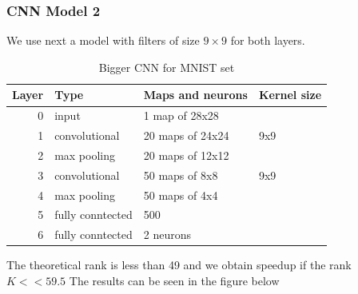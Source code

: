 \documentclass{article} %
\begin{document}
\subsubsection{CNN Model 2}

We use next a model with filters of size $9\times9$ for both layers.

\begin{table}
\centering
\begin{tabular}{@{}rlll@{}}\toprule
Layer & Type & Maps and neurons& Kernel size \\ \midrule
0 & input & 1 map of 28x28 &\\
1& convolutional & 20 maps of 24x24 & 9x9\\
2 & max pooling & 20 maps of 12x12 &  \\
3 & convolutional & 50 maps of 8x8& 9x9 \\
4 & max pooling & 50 maps of 4x4&  \\ 
5 & fully conntected& 500 & \\
6 & fully conntected & 2 neurons & \\ \bottomrule
\end{tabular}
\caption{Bigger CNN for MNIST set}
\label{fig:CNN2}
\end{table}

The theoretical rank is less than 49 and we obtain speedup if the rank $K << 59.5$
The results can be seen in the figure below
\end{document}
